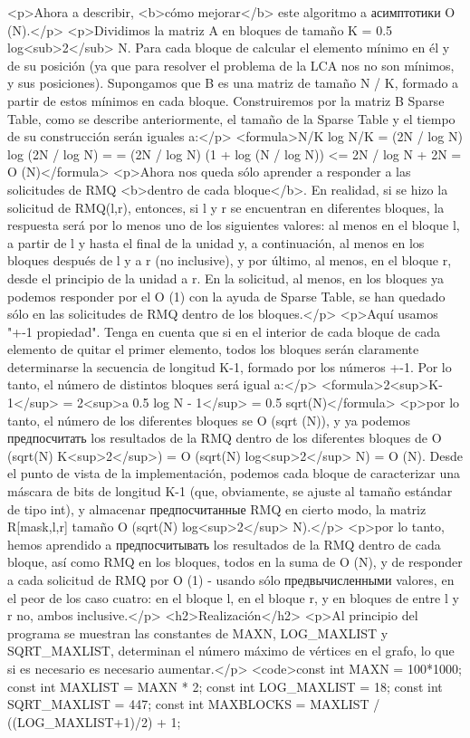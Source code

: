 <p>Ahora a describir, <b>cómo mejorar</b> este algoritmo a асимптотики O (N).</p>
<p>Dividimos la matriz A en bloques de tamaño K = 0.5 log<sub>2</sub> N. Para cada bloque de calcular el elemento mínimo en él y de su posición (ya que para resolver el problema de la LCA nos no son mínimos, y sus posiciones). Supongamos que B es una matriz de tamaño N / K, formado a partir de estos mínimos en cada bloque. Construiremos por la matriz B Sparse Table, como se describe anteriormente, el tamaño de la Sparse Table y el tiempo de su construcción serán iguales a:</p>
<formula>N/K log N/K = (2N / log N) log (2N / log N) =
= (2N / log N) (1 + log (N / log N)) <= 2N / log N + 2N = O (N)</formula>
<p>Ahora nos queda sólo aprender a responder a las solicitudes de RMQ <b>dentro de cada bloque</b>. En realidad, si se hizo la solicitud de RMQ(l,r), entonces, si l y r se encuentran en diferentes bloques, la respuesta será por lo menos uno de los siguientes valores: al menos en el bloque l, a partir de l y hasta el final de la unidad y, a continuación, al menos en los bloques después de l y a r (no inclusive), y por último, al menos, en el bloque r, desde el principio de la unidad a r. En la solicitud, al menos, en los bloques ya podemos responder por el O (1) con la ayuda de Sparse Table, se han quedado sólo en las solicitudes de RMQ dentro de los bloques.</p>
<p>Aquí usamos "+-1 propiedad". Tenga en cuenta que si en el interior de cada bloque de cada elemento de quitar el primer elemento, todos los bloques serán claramente determinarse la secuencia de longitud K-1, formado por los números +-1. Por lo tanto, el número de distintos bloques será igual a:</p>
<formula>2<sup>K-1</sup> = 2<sup>a 0.5 log N - 1</sup> = 0.5 sqrt(N)</formula>
<p>por lo tanto, el número de los diferentes bloques se O (sqrt (N)), y ya podemos предпосчитать los resultados de la RMQ dentro de los diferentes bloques de O (sqrt(N) K<sup>2</sup>) = O (sqrt(N) log<sup>2</sup> N) = O (N). Desde el punto de vista de la implementación, podemos cada bloque de caracterizar una máscara de bits de longitud K-1 (que, obviamente, se ajuste al tamaño estándar de tipo int), y almacenar предпосчитанные RMQ en cierto modo, la matriz R[mask,l,r] tamaño O (sqrt(N) log<sup>2</sup> N).</p>
<p>por lo tanto, hemos aprendido a предпосчитывать los resultados de la RMQ dentro de cada bloque, así como RMQ en los bloques, todos en la suma de O (N), y de responder a cada solicitud de RMQ por O (1) - usando sólo предвычисленными valores, en el peor de los caso cuatro: en el bloque l, en el bloque r, y en bloques de entre l y r no, ambos inclusive.</p>
<h2>Realización</h2>
<p>Al principio del programa se muestran las constantes de MAXN, LOG_MAXLIST y SQRT_MAXLIST, determinan el número máximo de vértices en el grafo, lo que si es necesario es necesario aumentar.</p>
<code>const int MAXN = 100*1000;
const int MAXLIST = MAXN * 2;
const int LOG_MAXLIST = 18;
const int SQRT_MAXLIST = 447;
const int MAXBLOCKS = MAXLIST / ((LOG_MAXLIST+1)/2) + 1;

